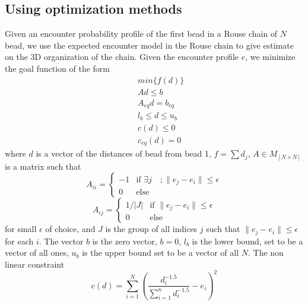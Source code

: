 \documentclass[12pt]{article}
\begin{document}
\subsection{Using optimization methods}\label{subsection_optimizationMethods}
Given an encounter probability profile of the first bead in a Rouse chain of $N$ bead, we use the expected encounter model in the Rouse chain to give estimate on the 3D organization of the chain. Given the encounter profile $e$, we minimize the goal function of the form
\begin{eqnarray}
&& min\{f(d)\}\\
&& Ad\leq b\\
&& A_{eq}d=b_{eq}\\
&& l_b\leq d\leq u_b\\
&& c(d)\leq0\\
&& c_{eq}(d)=0
\end{eqnarray}
where $d$ is a vector of the distances of bead from bead 1, $f=\sum{d_j}$, $A\in M_{[N\times N]}$ is a matrix such that
\begin{equation}
A_{ii} =
\left\{
	\begin{array}{ll}
		 -1 & \mbox{if } \exists j \quad ;\|e_j-e_i\|\leq \epsilon \\
		 0 & \mbox{else} 
	\end{array}
\right.
\end{equation}
\begin{equation}
A_{ij} =
\left\{
	\begin{array}{ll}
		1/|J|  & \mbox{if } \|e_j-e_i\|\leq \epsilon \\
		0 & \mbox{else } 
	\end{array}
\right.
\end{equation}
for small $\epsilon$ of choice, and $J$ is the group of all indices $j$ such that $\|e_j-e_i\|\leq \epsilon$ for each $i$. The vector $b$ is the zero vector,  $b=0$, $l_b$ is the lower bound, set to be a vector of all ones, $u_b$ is the upper bound set to be a vector of all $N$. The non linear constraint 
\begin{equation}
c(d) = \sum_{i=1}^N \left(\frac{d_i^{-1.5}}{\sum_{i=1}^n d_i^{-1.5}}-e_i\right)^2
\end{equation}


\end{document}
